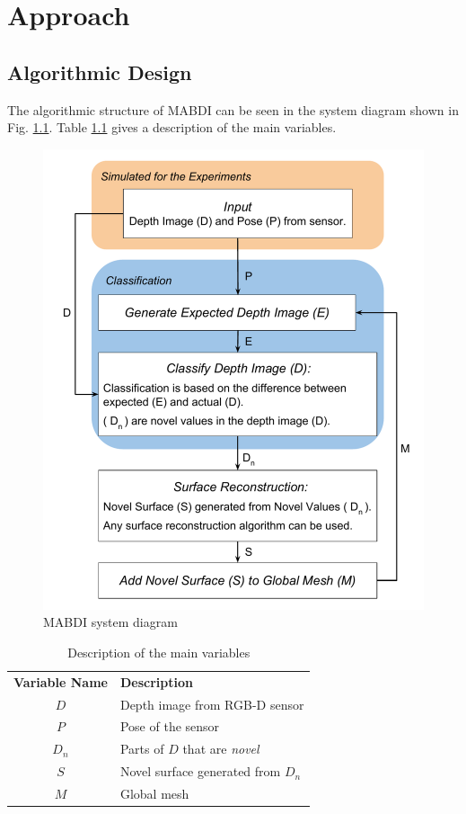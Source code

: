 \chapter{Approach}	\label{chapter:approach}

\section{Algorithmic Design}
\label{section:algorithmic_design}

The algorithmic structure of MABDI can be seen in the system diagram shown in
Fig. \ref{fig:system}. Table \ref{tab:var} gives a description of the main
variables.

\begin{figure}[h!]%
\centering
  \includegraphics[width=.70\textwidth]{figures/approach_mabdi_algorithm.pdf}
  \caption{MABDI system diagram}
  \label{fig:system}
\end{figure}

\begin{table}[h]
  \caption{Description of the main variables}
  \label{tab:var}
  \begin{center}
    \begin{tabular}{c|l}
    \cellcolor{white} {\bf Variable Name} & {\bf Description} \\ %
    \rowcolor{LightGray}
    $D$ & Depth image from RGB-D sensor \\
    $P$ & Pose of the sensor \\
    \rowcolor{LightGray}
    $D_n$ & Parts of $D$ that are \emph{novel} \\
    $S$ & Novel surface generated from $D_n$ \\
    \rowcolor{LightGray}
    $M$ & Global mesh \\
    \end{tabular}
  \end{center}
\end{table}

